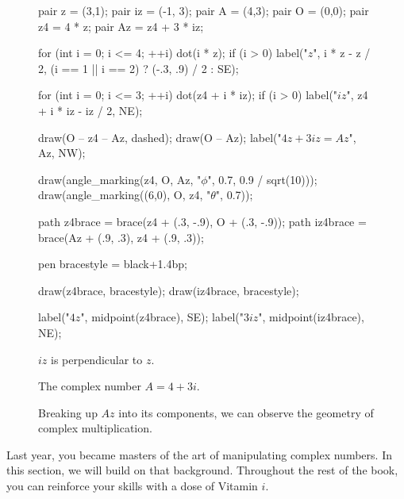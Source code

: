 \documentclass[../textbook.tex]{subfiles}
\begin{document}
\begin{figure}[h]
\begin{center}
\begin{minipage}[b]{0.4\textwidth}
\begin{asy}[width=0.7\textwidth]
				pair z = (3,1);
				pair iz = (-1, 3);
				pair A = (4,3);
				pair O = (0,0);
				pair z4 = 4 * z;
				pair Az = z4 + 3 * iz;
				
				for (int i = 0; i <= 4; ++i) {
				dot(i * z);
				if (i > 0) label("$z$", i * z - z / 2, (i == 1 || i == 2) ? (-.3, .9) / 2 : SE);
				}
				
				for (int i = 0; i <= 3; ++i) {
				dot(z4 + i * iz);
				if (i > 0) label("$iz$", z4 + i * iz - iz / 2, NE);
				}
				
				draw(O -- z4 -- Az, dashed);
				draw(O -- Az);
				label("$4z + 3iz = Az$", Az, NW);
				
				draw(angle_marking(z4, O, Az, "$\phi$", 0.7, 0.9 / sqrt(10)));
				draw(angle_marking((6,0), O, z4, "$\theta$", 0.7));
				
				path z4brace = brace(z4 + (.3, -.9), O + (.3, -.9));
				path iz4brace = brace(Az + (.9, .3), z4 + (.9, .3));
				
				pen bracestyle = black+1.4bp;
				
				draw(z4brace, bracestyle);
				draw(iz4brace, bracestyle);
				
				label("$4z$", midpoint(z4brace), SE);
				label("$3iz$", midpoint(iz4brace), NE);
			\end{asy}
		\end{minipage}
	\end{center}
	\vspace*{-2\baselineskip}
	\begin{center}
		\begin{minipage}[t]{0.25\textwidth}
			\caption{$iz$ is perpendicular to $z$.}
			\label{fig:izzperp}
		\end{minipage}
		\hfill
		\begin{minipage}[t]{0.25\textwidth}
			\caption{The complex number $A=4+3i$.}
			\label{fig:lol}
		\end{minipage}
		\hfill
		\begin{minipage}[t]{0.4\textwidth}
			\caption{Breaking up $Az$ into its components, we can observe the geometry of complex multiplication.}
		\end{minipage}
	\end{center}
	\vspace*{-2\baselineskip}
\end{figure}

\noindent Last year, you became masters of the art of manipulating complex numbers. In this section, we will build on that background. Throughout the rest of the book, you can reinforce your skills with a dose of Vitamin $i$.
\end{document}
